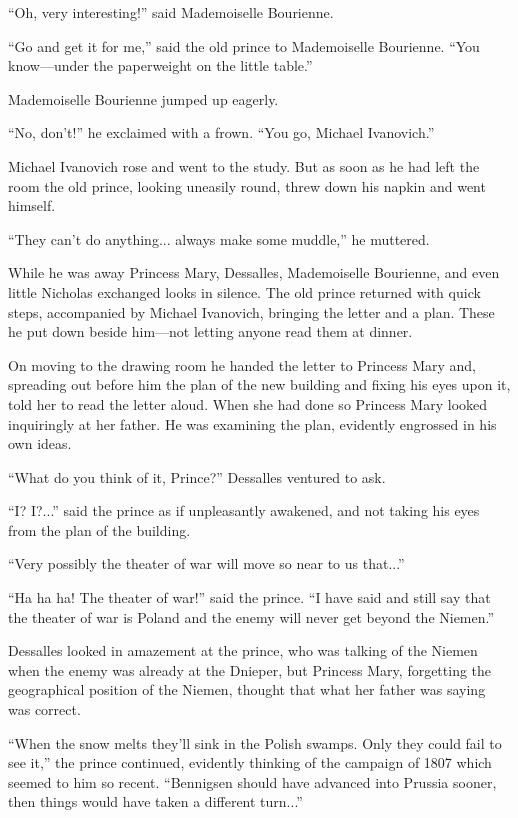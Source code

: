 ``Oh, very interesting!'' said Mademoiselle Bourienne.

``Go and get it for me,'' said the old prince to Mademoiselle
Bourienne.  ``You know---under the paperweight on the little
table.''

Mademoiselle Bourienne jumped up eagerly.

``No, don't!'' he exclaimed with a frown. ``You go, Michael
Ivanovich.''

Michael Ivanovich rose and went to the study. But as soon as he
had left the room the old prince, looking uneasily round, threw
down his napkin and went himself.

``They can't do anything... always make some muddle,'' he
muttered.

While he was away Princess Mary, Dessalles, Mademoiselle
Bourienne, and even little Nicholas exchanged looks in
silence. The old prince returned with quick steps, accompanied by
Michael Ivanovich, bringing the letter and a plan. These he put
down beside him---not letting anyone read them at dinner.

On moving to the drawing room he handed the letter to Princess
Mary and, spreading out before him the plan of the new building
and fixing his eyes upon it, told her to read the letter
aloud. When she had done so Princess Mary looked inquiringly at
her father. He was examining the plan, evidently engrossed in his
own ideas.

``What do you think of it, Prince?'' Dessalles ventured to ask.

``I? I?...'' said the prince as if unpleasantly awakened, and not
taking his eyes from the plan of the building.

``Very possibly the theater of war will move so near to us
that...''

``Ha ha ha! The theater of war!'' said the prince. ``I have said
and still say that the theater of war is Poland and the enemy
will never get beyond the Niemen.''

Dessalles looked in amazement at the prince, who was talking of
the Niemen when the enemy was already at the Dnieper, but
Princess Mary, forgetting the geographical position of the
Niemen, thought that what her father was saying was correct.

``When the snow melts they'll sink in the Polish swamps. Only
they could fail to see it,'' the prince continued, evidently
thinking of the campaign of 1807 which seemed to him so
recent. ``Bennigsen should have advanced into Prussia sooner,
then things would have taken a different turn...''

